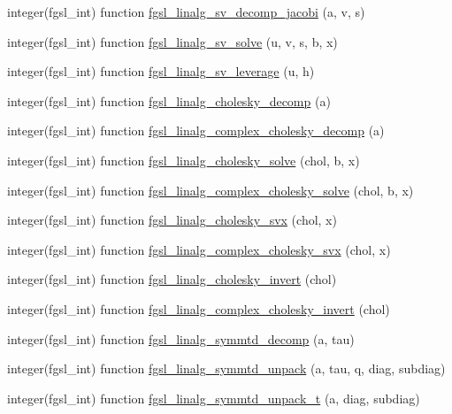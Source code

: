\begin{DoxyCompactItemize}
\item 
integer(fgsl\-\_\-int) function \hyperlink{linalg_8finc_a523fe136a01c78b49531b7e0156b97b6}{fgsl\-\_\-linalg\-\_\-sv\-\_\-decomp\-\_\-jacobi} (a, v, s)
\item 
integer(fgsl\-\_\-int) function \hyperlink{linalg_8finc_a6d96a619a57aeb6a8713babe93a9b71b}{fgsl\-\_\-linalg\-\_\-sv\-\_\-solve} (u, v, s, b, x)
\item 
integer(fgsl\-\_\-int) function \hyperlink{linalg_8finc_a41dd0ef07e31a1e6d109e4d9a0ea8a13}{fgsl\-\_\-linalg\-\_\-sv\-\_\-leverage} (u, h)
\item 
integer(fgsl\-\_\-int) function \hyperlink{linalg_8finc_aa2fa70a59c49090e137f5df8c8c0100f}{fgsl\-\_\-linalg\-\_\-cholesky\-\_\-decomp} (a)
\item 
integer(fgsl\-\_\-int) function \hyperlink{linalg_8finc_a8f9547ecd2fa79bcf02e423c078bb4ea}{fgsl\-\_\-linalg\-\_\-complex\-\_\-cholesky\-\_\-decomp} (a)
\item 
integer(fgsl\-\_\-int) function \hyperlink{linalg_8finc_a7bca2d4f11f9e651c747926af5a5be70}{fgsl\-\_\-linalg\-\_\-cholesky\-\_\-solve} (chol, b, x)
\item 
integer(fgsl\-\_\-int) function \hyperlink{linalg_8finc_a7ff644dd25158aa5e839ccbc63a5d323}{fgsl\-\_\-linalg\-\_\-complex\-\_\-cholesky\-\_\-solve} (chol, b, x)
\item 
integer(fgsl\-\_\-int) function \hyperlink{linalg_8finc_ac949d4b315b2803bf6d98a3b1549321a}{fgsl\-\_\-linalg\-\_\-cholesky\-\_\-svx} (chol, x)
\item 
integer(fgsl\-\_\-int) function \hyperlink{linalg_8finc_a20424291c37db28845ad5b97cbefb32d}{fgsl\-\_\-linalg\-\_\-complex\-\_\-cholesky\-\_\-svx} (chol, x)
\item 
integer(fgsl\-\_\-int) function \hyperlink{linalg_8finc_a0613e58907c2ae3d3527bc6d76db20f9}{fgsl\-\_\-linalg\-\_\-cholesky\-\_\-invert} (chol)
\item 
integer(fgsl\-\_\-int) function \hyperlink{linalg_8finc_ab986997d7b43b9df1c81a62c0117d3da}{fgsl\-\_\-linalg\-\_\-complex\-\_\-cholesky\-\_\-invert} (chol)
\item 
integer(fgsl\-\_\-int) function \hyperlink{linalg_8finc_a529a24d383e0ed224830a3b5a45329b4}{fgsl\-\_\-linalg\-\_\-symmtd\-\_\-decomp} (a, tau)
\item 
integer(fgsl\-\_\-int) function \hyperlink{linalg_8finc_a43c68814765ca38dd4054712c4dde774}{fgsl\-\_\-linalg\-\_\-symmtd\-\_\-unpack} (a, tau, q, diag, subdiag)
\item 
integer(fgsl\-\_\-int) function \hyperlink{linalg_8finc_a4d487701aea9f427ae6482afc63567ee}{fgsl\-\_\-linalg\-\_\-symmtd\-\_\-unpack\-\_\-t} (a, diag, subdiag)

\end{DoxyCompactItemize}
